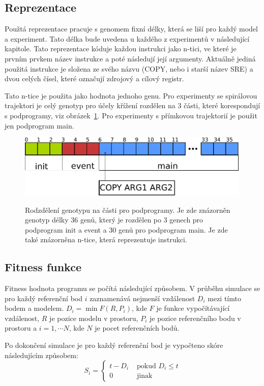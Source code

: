 \subsection{Reprezentace}
Použtá reprezentace pracuje s genomem fixní délky, která se liší pro každý model a experiment.
Tato délka bude uvedena u každého z experimentů v následující kapitole.
Tato reprezentace kóduje každou instrukci jako n-tici, ve které je prvním prvkem název instrukce a poté následují její argumenty.
Aktuálně jediná použitá instrukce je složena ze svého názvu (COPY, nebo i starší název SRE) a dvou celých čísel, které označují zdrojový a cílový registr.

Tato n-tice je použita jako hodnota jednoho genu.
Pro experimenty se spirálovou trajektori je celý genotyp pro účely křížení rozdělen na 3 části, které korespondují s podprogramy, viz obrázek~\ref{fig:genotyp}.
Pro experimenty s přímkovou trajektorií je použit jen podprogram main.

\begin{figure}[h]
    \centering
    {\includegraphics[width=30em]{obrazky/genotyp.pdf}}
    \caption{
    Rodzdělení genotypu na části pro podprogramy.
    Je zde znázorněn genotyp délky 36 genů, který je rozdělen po 3 genech pro podprogram init a event a 30 genů pro podprogram main.
    Je zde také znázorněna n-tice, která reprezentuje instrukci.
    }
    \label{fig:genotyp}
\end{figure}


\subsection{Fitness funkce}
Fitness hodnota programu se počítá následující způsobem.
V průběhu simulace se pro každý referenční bod $i$ zaznamenává nejmenší vzdálenost $D_i$ mezi tímto bodem a modelem.
$D_i = \min{F(R, P_i)}$, kde $F$ je funkce vypočítávající vzdálenost, $R$ je pozice modelu v prostoru, $P_i$ je pozice referenčního bodu v prostoru a $i=1, \cdots N$, kde $N$ je pocet referenčních bodů.

Po dokončení simulace je pro každý referenční bod je vypočteno skóre následujícím způsobem:
$$S_i=\left\{\begin{matrix}
                 t - D_i&\mbox{ pokud }D_{i}\leq t\\ 0 &\mbox{ jinak }
\end{matrix}\right.$$

